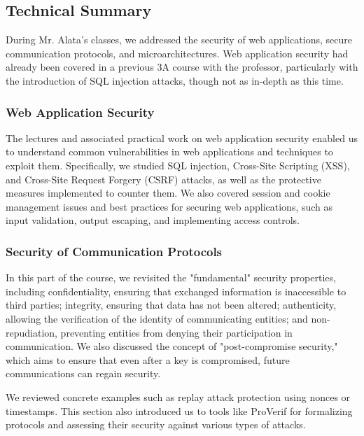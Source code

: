 \subsection{Technical Summary}
\indent \indent During Mr. Alata's classes, we addressed the security of web applications, secure communication protocols, and microarchitectures. Web application security had already been covered in a previous 3A course with the professor, particularly with the introduction of SQL injection attacks, though not as in-depth as this time.

\subsubsection{Web Application Security}
\indent \indent The lectures and associated practical work on web application security enabled us to understand common vulnerabilities in web applications and techniques to exploit them. Specifically, we studied SQL injection, Cross-Site Scripting (XSS), and Cross-Site Request Forgery (CSRF) attacks, as well as the protective measures implemented to counter them. We also covered session and cookie management issues and best practices for securing web applications, such as input validation, output escaping, and implementing access controls.

\subsubsection{Security of Communication Protocols}
\indent \indent In this part of the course, we revisited the "fundamental" security properties, including confidentiality, ensuring that exchanged information is inaccessible to third parties; integrity, ensuring that data has not been altered; authenticity, allowing the verification of the identity of communicating entities; and non-repudiation, preventing entities from denying their participation in communication. We also discussed the concept of "post-compromise security," which aims to ensure that even after a key is compromised, future communications can regain security.
\vspace{0.25cm}

\noindent We reviewed concrete examples such as replay attack protection using nonces or timestamps. This section also introduced us to tools like ProVerif for formalizing protocols and assessing their security against various types of attacks.

